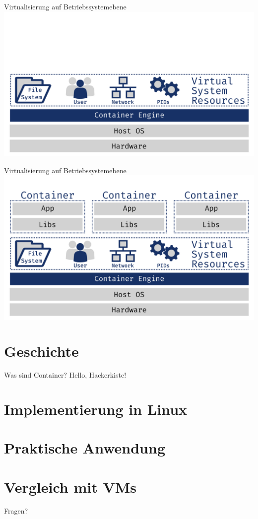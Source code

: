 \documentclass{beamer}
\begin{document}
  \begin{frame}{Virtualisierung auf Betriebssystemebene}
    \includegraphics[width=\textwidth]{os-virt}
  \end{frame}
  \begin{frame}{Virtualisierung auf Betriebssystemebene}
  	\includegraphics[width=\textwidth]{container}
  \end{frame}

  \section{Geschichte}
  \begin{frame}{Was sind Container?}
    Hello, Hackerkiste!
  \end{frame}

  \section{Implementierung in Linux}
  \section{Praktische Anwendung}
  \section{Vergleich mit VMs}

  \begin{frame}[standout]
    Fragen?
  \end{frame}
\end{document}
